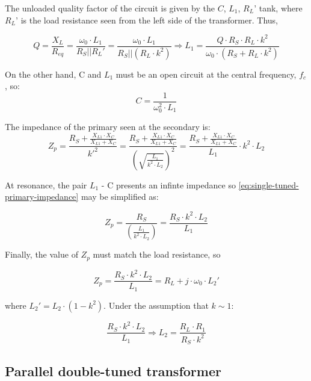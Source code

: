 \noindent The unloaded quality factor of the circuit is given by the $C$, $L_1$, $R_L’$ tank, where $R_L’$ is the load resistance seen from the left side of the transformer. Thus,

\begin{equation}
Q = \frac{X_L}{R_{eq}} = \frac{\omega_0 \cdot L_1}{R_S \lvert \lvert R_L'} = \frac{\omega_0 \cdot L_1}{R_S \lvert \lvert (R_L \cdot k^2)} \Longrightarrow L_1 = \frac{Q \cdot R_S \cdot R_L \cdot k^2}{\omega_0 \cdot (R_S + R_L \cdot k^2)}
\end{equation}

\noindent On the other hand, C and $L_1$ must be an open circuit at the central frequency, $f_c$, so:
\begin{equation}
C = \frac{1}{\omega_0^2 \cdot L_1}
\end{equation}

\noindent The impedance of the primary seen at the secondary is:
\begin{equation}
Z_p = \frac{R_S + \frac{X_{L1} \cdot X_C}{X_{L1} + X_C}}{k'^2} = \frac{R_S + \frac{X_{L1} \cdot X_C}{X_{L1} + X_C}}{\left( \sqrt{\frac{L_1}{k^2 \cdot L_2}}\right)^2} = \frac{R_S + \frac{X_{L1} \cdot X_C}{X_{L1} + X_C}}{L_1} \cdot k^2 \cdot L_2 
\label{eq:single-tuned-primary-impedance}
\end{equation}

\noindent At resonance, the pair $L_1$ - C presents an infinte impedance so \ref{eq:single-tuned-primary-impedance} may be simplified as:

\begin{equation}
Z_p = \frac{R_S}{\left( \frac{L_1}{k^2 \cdot L_2} \right)} = \frac{R_S \cdot k^2 \cdot L_2}{L_1}
\end{equation}

\noindent Finally, the value of $Z_p$ must match the load resistance, so

\begin{equation}
Z_p = \frac{R_S \cdot k^2 \cdot L_2}{L_1} = R_L + j \cdot \omega_0 \cdot L_2'
\end{equation}

\noindent where $L_2' = L_2 \cdot (1 - k^2)$. Under the assumption that $k \sim 1$:

\begin{equation}
\frac{R_S \cdot k^2 \cdot L_2}{L_1} \Longrightarrow L_2 = \frac{R_L \cdot R_1}{R_S \cdot k^2}
\end{equation}

\subsection{Parallel double-tuned transformer}

